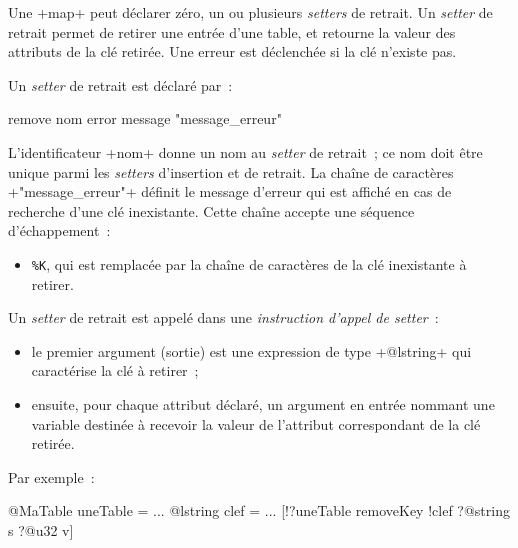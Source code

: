 
Une \ggsq+map+ peut déclarer zéro, un ou plusieurs \emph{setters} de retrait. Un \emph{setter} de retrait permet de retirer une entrée d'une table, et retourne la valeur des attributs de la clé retirée. Une erreur est déclenchée si la clé n'existe pas.


Un \emph{setter} de retrait est déclaré par~:

\begin{galgas4}
remove nom error message "message_erreur"
\end{galgas4}

\begin{galgas4}
\end{galgas4}

L'identificateur \ggsq+nom+ donne un nom au \emph{setter} de retrait~; ce nom doit être unique parmi les \emph{setters} d'insertion et de retrait. La chaîne de caractères \ggsq+"message_erreur"+ définit le message d'erreur qui est affiché en cas de recherche d'une clé inexistante. Cette chaîne accepte une séquence d'échappement~:
\begin{itemize}
  \item \texttt{\%K}, qui est remplacée par la chaîne de caractères de la clé inexistante à retirer.
\end{itemize}


Un \emph{setter} de retrait est appelé dans une \emph{instruction d'appel de setter}~:
\begin{itemize}
  \item le premier argument (sortie) est une expression de type \ggsq+@lstring+ qui caractérise la clé à retirer~;
  \item ensuite, pour chaque attribut déclaré, un argument en entrée nommant une variable destinée à recevoir la valeur de l'attribut correspondant de la clé retirée.
\end{itemize}

Par exemple~:
\begin{galgas4}
@MaTable uneTable = {}
...
@lstring clef = ...
[!?uneTable removeKey !clef ?@string s ?@u32 v]
\end{galgas4}










